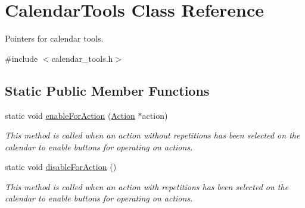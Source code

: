 \hypertarget{struct_calendar_tools}{\section{Calendar\-Tools Class Reference}
\label{struct_calendar_tools}
}


Pointers for calendar tools.  




{\ttfamily \#include $<$calendar\-\_\-tools.\-h$>$}

\subsection*{Static Public Member Functions}
\begin{DoxyCompactItemize}
\item 
static void \hyperlink{struct_calendar_tools_a499725b50479cb7ecbb6e0eb3854970a}{enable\-For\-Action} (\hyperlink{class_action}{Action} $\ast$action)
\begin{DoxyCompactList}\small\item\em This method is called when an action without repetitions has been selected on the calendar to enable buttons for operating on actions. \end{DoxyCompactList}\item 
static void \hyperlink{struct_calendar_tools_a107f3ffac6ca0ed79f18cd38cdc0905b}{disable\-For\-Action} ()
\begin{DoxyCompactList}\small\item\em This method is called when an action with repetitions has been selected on the calendar to enable buttons for operating on actions. \end{DoxyCompactList}\end{DoxyCompactItemize}
